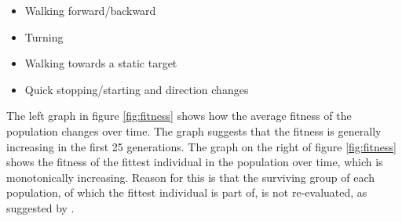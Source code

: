 \documentclass{article}
\begin{document}
\begin{itemize}
\setlength{\itemsep}{-2pt}
\item Walking forward/backward
\item Turning
\item Walking towards a static target
\item Quick stopping/starting and direction changes
\end{itemize}

The left graph in figure \ref{fig:fitness} shows how the average fitness of the
population changes over time. The graph suggests that the fitness is generally
increasing in the first 25 generations. The graph on the right of figure \ref{fig:fitness} shows the fitness of the fittest individual in the population over time, which is monotonically increasing. 
Reason for this is that the surviving group of each population, of which the fittest individual is part of, is not re-evaluated, as suggested by \cite{haasdijk2012never}.
\end{document}

